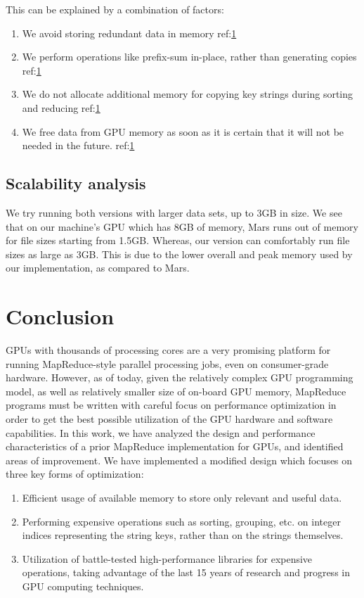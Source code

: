 \documentclass{article}
\begin{document}
This can be explained by a combination of factors:
\begin{enumerate}
    \item We avoid storing redundant data in memory ref:\ref{} 
    \item We perform operations like prefix-sum in-place, rather than generating copies ref:\ref{}
    \item We do not allocate additional memory for copying key strings during sorting and reducing ref:\ref{}
    \item We free data from GPU memory as soon as it is certain that it will not be needed in the future. ref:\ref{}
\end{enumerate}


\subsection{Scalability analysis}
We try running both versions with larger data sets, up to 3GB in size. We see that on our machine's GPU which has 8GB of memory, Mars runs out of memory for file sizes starting from 1.5GB. Whereas, our version can comfortably run file sizes as large as 3GB. This is due to the lower overall and peak memory used by our implementation, as compared to Mars.



\section{Conclusion}
GPUs with thousands of processing cores are a very promising platform for running MapReduce-style parallel processing jobs, even on consumer-grade hardware. However, as of today, given the relatively complex GPU programming model, as well as relatively smaller size of on-board GPU memory, MapReduce programs must be written with careful focus on performance optimization in order to get the best possible utilization of the GPU hardware and software capabilities. 
In this work, we have analyzed the design and performance characteristics of a prior MapReduce implementation for GPUs, and identified areas of improvement. We have implemented a modified design which focuses on three key forms of optimization:
\begin{enumerate}
    \item Efficient usage of available memory to store only relevant and useful data.
    \item Performing expensive operations such as sorting, grouping, etc. on integer indices representing the string keys, rather than on the strings themselves.
    \item Utilization of battle-tested high-performance libraries for expensive operations, taking advantage of the last 15 years of research and progress in GPU computing techniques.
\end{enumerate}
\end{document}
